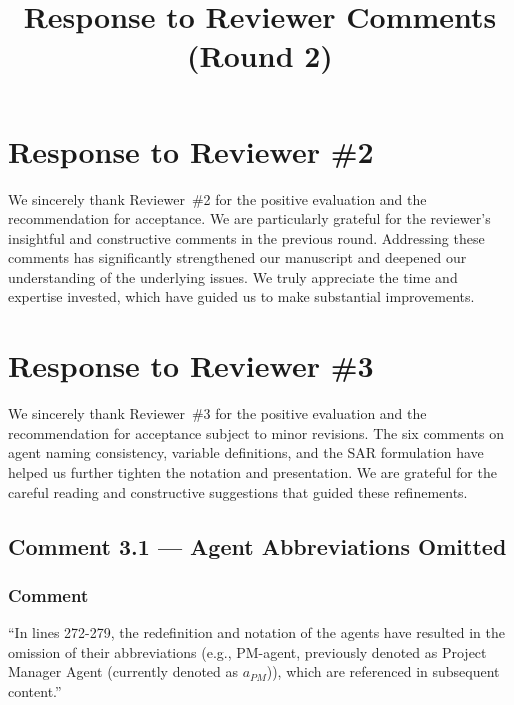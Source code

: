 \documentclass[11pt,a4paper]{article}
\title{Response to Reviewer Comments (Round 2)}
\author{}
\date{}
\begin{document}
\maketitle
\setcounter{tocdepth}{2}
\tableofcontents
\newpage

\section{Response to Reviewer \#2}

We sincerely thank Reviewer~\#2 for the positive evaluation and the recommendation for acceptance. We are particularly grateful for the reviewer's insightful and constructive comments in the previous round. Addressing these comments has significantly strengthened our manuscript and deepened our understanding of the underlying issues. We truly appreciate the time and expertise invested, which have guided us to make substantial improvements.

\section{Response to Reviewer \#3}

We sincerely thank Reviewer~\#3 for the positive evaluation and the recommendation for acceptance subject to minor revisions. The six comments on agent naming consistency, variable definitions, and the SAR formulation have helped us further tighten the notation and presentation. We are grateful for the careful reading and constructive suggestions that guided these refinements.

\subsection{Comment 3.1 --- Agent Abbreviations Omitted}

\subsubsection{Comment}
``In lines 272-279, the redefinition and notation of the agents have resulted in the omission of their abbreviations (e.g., PM-agent, previously denoted as Project Manager Agent (currently denoted as $a_{PM}$)), which are referenced in subsequent content.''
\end{document}
